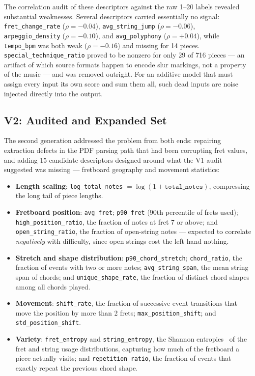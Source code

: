 The correlation audit of these descriptors against the raw 1--20 labels revealed substantial weaknesses. Several descriptors carried essentially no signal: \texttt{fret\_change\_rate} ($\rho = -0.04$), \texttt{avg\_string\_jump} ($\rho = -0.06$), \texttt{arpeggio\_density} ($\rho = -0.10$), and \texttt{avg\_polyphony} ($\rho = +0.04$), while \texttt{tempo\_bpm} was both weak ($\rho = -0.16$) and missing for 14 pieces. \texttt{special\_technique\_ratio} proved to be nonzero for only 29 of 716 pieces --- an artifact of which source formats happen to encode slur markings, not a property of the music --- and was removed outright. For an additive model that must assign every input its own score and sum them all, such dead inputs are noise injected directly into the output.

\subsection{V2: Audited and Expanded Set}
The second generation addressed the problem from both ends: repairing extraction defects in the PDF parsing path that had been corrupting fret values, and adding 15 candidate descriptors designed around what the V1 audit suggested was missing --- fretboard geography and movement statistics:
\begin{itemize}
    \item \textbf{Length scaling}: \texttt{log\_total\_notes} $= \log(1 + \texttt{total\_notes})$, compressing the long tail of piece lengths.
    \item \textbf{Fretboard position}: \texttt{avg\_fret}; \texttt{p90\_fret} (90th percentile of frets used); \texttt{high\_position\_ratio}, the fraction of notes at fret 7 or above; and \texttt{open\_string\_ratio}, the fraction of open-string notes --- expected to correlate \emph{negatively} with difficulty, since open strings cost the left hand nothing.
    \item \textbf{Stretch and shape distribution}: \texttt{p90\_chord\_stretch}; \texttt{chord\_ratio}, the fraction of events with two or more notes; \texttt{avg\_string\_span}, the mean string span of chords; and \texttt{unique\_shape\_rate}, the fraction of distinct chord shapes among all chords played.
    \item \textbf{Movement}: \texttt{shift\_rate}, the fraction of successive-event transitions that move the position by more than 2 frets; \texttt{max\_position\_shift}; and \texttt{std\_position\_shift}.
    \item \textbf{Variety}: \texttt{fret\_entropy} and \texttt{string\_entropy}, the Shannon entropies~\cite{shannon1948mathematical} of the fret and string usage distributions, capturing how much of the fretboard a piece actually visits; and \texttt{repetition\_ratio}, the fraction of events that exactly repeat the previous chord shape.
\end{itemize}

